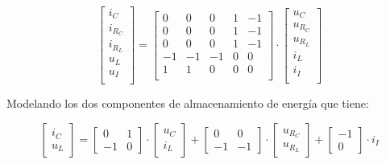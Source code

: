 \vspace{-0.5cm}
\begin{equation}
    \begin{bmatrix}
        i_C\\
        i_{R_C}\\
        i_{R_L}\\
        u_L\\
        u_I\\
    \end{bmatrix}
    =
    \begin{bmatrix}
        0 & 0 & 0 & 1 & -1\\
        0 & 0 & 0 & 1 & -1\\
        0 & 0 & 0 & 1 & -1\\
        -1 & -1 & -1 & 0 & 0\\
        1 & 1 & 0 & 0 & 0\\
    \end{bmatrix}
    \cdot
    \begin{bmatrix}
        u_C\\
        u_{R_C}\\
        u_{R_L}\\
        i_L\\
        i_I\\
    \end{bmatrix}
\end{equation}

Modelando los dos componentes de almacenamiento de energía que tiene:

\vspace{-0.5cm}
\begin{equation}
    \begin{bmatrix}
        i_C \\
        u_L
    \end{bmatrix}
    =
    \begin{bmatrix}
        0 & 1 \\
        -1 & 0
    \end{bmatrix}
    \cdot
    \begin{bmatrix}
        u_C \\
        i_L
    \end{bmatrix}
    +
    \begin{bmatrix}
        0 & 0 \\
        -1 & -1
    \end{bmatrix}
    \cdot
    \begin{bmatrix}
        u_{R_C} \\
        u_{R_L}
    \end{bmatrix}
    +
    \begin{bmatrix}
        -1 \\
        0
    \end{bmatrix}
    \cdot
    i_I
\end{equation}

